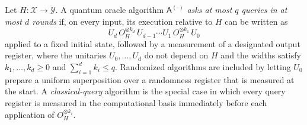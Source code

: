\documentclass{conjura-conjecture}
\begin{document}
\begin{definition}\label{def:rounds}
Let $H \colon \mathcal{X} \to \mathcal{Y}$. A quantum oracle algorithm
$\mathsf{A}^{(\cdot)}$ \emph{asks at most $q$ queries in at most $d$ rounds}
if, on every input, its execution relative to $H$ can be written as
\[
  U_{d}\, O_H^{\otimes k_{d}}\, U_{d-1} \cdots U_{1}\,
  O_H^{\otimes k_{1}}\, U_{0}
\]
applied to a fixed initial state, followed by a measurement of a designated
output register, where the unitaries $U_0, \dots, U_{d}$ do not depend on
$H$ and the widths satisfy $k_1, \dots, k_{d} \ge 0$ and
$\sum_{i=1}^{d} k_i \le q$. Randomized algorithms are included by letting
$U_0$ prepare a uniform superposition over a randomness register that is
measured at the start. A \emph{classical-query} algorithm is the special
case in which every query register is measured in the computational basis
immediately before each application of $O_H^{\otimes k_i}$.
\end{definition}
\end{document}

